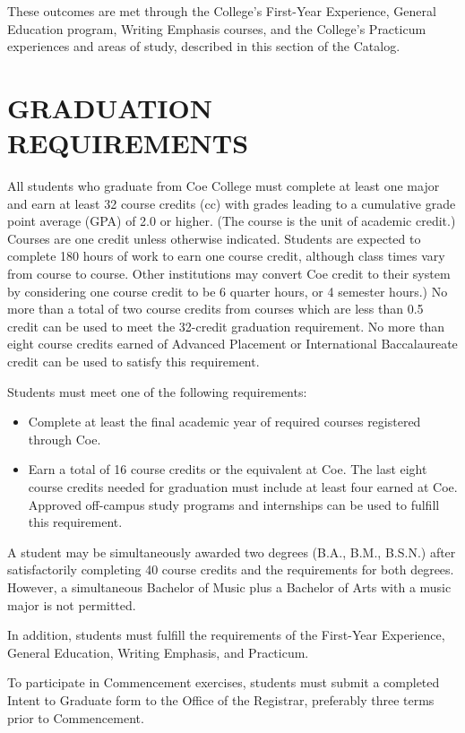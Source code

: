 \documentclass[
  letterpaper,
]{scrbook}
\providecommand{\tightlist}{%
  \setlength{\itemsep}{0pt}\setlength{\parskip}{0pt}}
\begin{document}
These outcomes are met through the College's First-Year Experience,
General Education program, Writing Emphasis courses, and the College's
Practicum experiences and areas of study, described in this section of
the Catalog.

\chapter{GRADUATION REQUIREMENTS}\label{sec-graduation-requirements}

All students who graduate from Coe College must complete at least one
major and earn at least 32 course credits (cc) with grades leading to a
cumulative grade point average (GPA) of 2.0 or higher. (The course is
the unit of academic credit.) Courses are one credit unless otherwise
indicated. Students are expected to complete 180 hours of work to earn
one course credit, although class times vary from course to course.
Other institutions may convert Coe credit to their system by considering
one course credit to be 6 quarter hours, or 4 semester hours.) No more
than a total of two course credits from courses which are less than 0.5
credit can be used to meet the 32-credit graduation requirement. No more
than eight course credits earned of Advanced Placement or International
Baccalaureate credit can be used to satisfy this requirement.

Students must meet one of the following requirements:

\begin{itemize}
\tightlist
\item
  Complete at least the final academic year of required courses
  registered through Coe.
\item
  Earn a total of 16 course credits or the equivalent at Coe. The last
  eight course credits needed for graduation must include at least four
  earned at Coe. Approved off-campus study programs and internships can
  be used to fulfill this requirement.
\end{itemize}

A student may be simultaneously awarded two degrees (B.A., B.M., B.S.N.)
after satisfactorily completing 40 course credits and the requirements
for both degrees. However, a simultaneous Bachelor of Music plus a
Bachelor of Arts with a music major is not permitted.

In addition, students must fulfill the requirements of the First-Year
Experience, General Education, Writing Emphasis, and Practicum.

To participate in Commencement exercises, students must submit a
completed Intent to Graduate form to the Office of the Registrar,
preferably three terms prior to Commencement.
\end{document}
